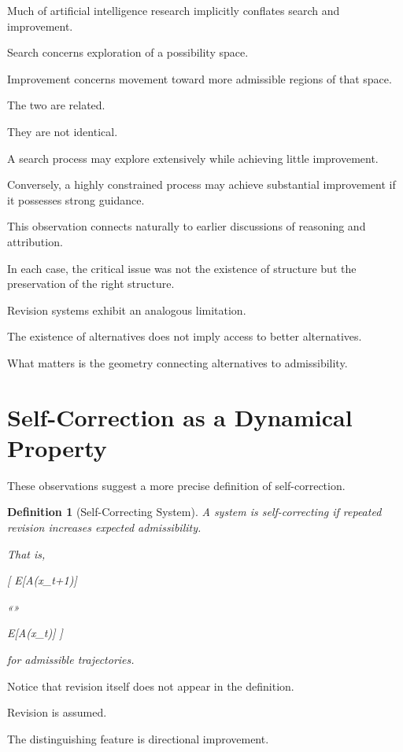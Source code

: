 \documentclass[11pt,oneside,openany]{book}
\newtheorem{definition}{Definition}[chapter] \newtheorem{theorem}{Theorem}[chapter] \newtheorem{proposition}{Proposition}[chapter] \newtheorem{lemma}{Lemma}[chapter] \newtheorem{corollary}{Corollary}[chapter] \newtheorem{remark}{Remark}[chapter]
\begin{document}
Much of artificial intelligence research implicitly conflates search and improvement.

Search concerns exploration of a possibility space.

Improvement concerns movement toward more admissible regions of that space.

The two are related.

They are not identical.

A search process may explore extensively while achieving little improvement.

Conversely, a highly constrained process may achieve substantial improvement if it possesses strong guidance.

This observation connects naturally to earlier discussions of reasoning and attribution.

In each case, the critical issue was not the existence of structure but the preservation of the right structure.

Revision systems exhibit an analogous limitation.

The existence of alternatives does not imply access to better alternatives.

What matters is the geometry connecting alternatives to admissibility.

\section{Self-Correction as a Dynamical Property}

These observations suggest a more precise definition of self-correction.

\begin{definition}[Self-Correcting System]

A system is self-correcting if repeated revision increases expected admissibility.

That is,

[
\mathbb E[A(x_{t+1})]

«»

\mathbb E[A(x_t)]
]

for admissible trajectories.

\end{definition}

Notice that revision itself does not appear in the definition.

Revision is assumed.

The distinguishing feature is directional improvement.
\end{document}
